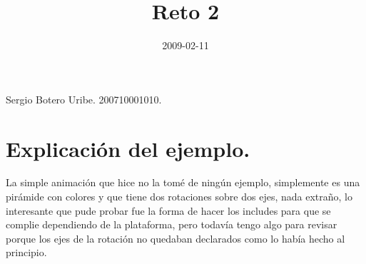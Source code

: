 \documentclass[]{article}
\title{Reto 2}
\author{  }
\date{2009-02-11}
\begin{document}
\ifpdf
{}
\else
{}
\fi

\maketitle

Sergio Botero Uribe. 200710001010.


\section{Explicaci\'on del ejemplo.}
La simple animaci\'on que hice no la tom\'e de ning\'un ejemplo, simplemente es una pir\'amide con colores y que tiene dos rotaciones sobre dos ejes, nada extra\~no, lo interesante que pude probar fue la forma de hacer los includes para que se complie dependiendo de la plataforma, pero todav\'ia tengo algo para revisar porque los ejes de la rotaci\'on no quedaban declarados como lo hab\'ia hecho al principio.


\end{document}
